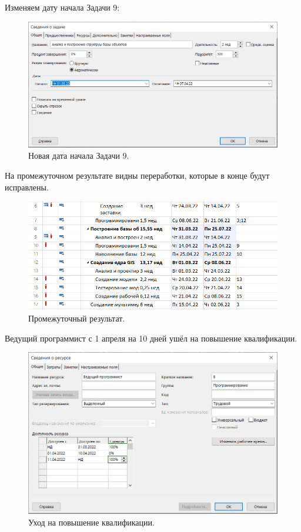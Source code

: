 \documentclass[a4paper,14pt]{extreport} %
\begin{document}
\begin{enumerate}
Изменяем дату начала Задачи 9:
\begin{figure}[H]
	\centering
	\caption{Новая дата начала Задачи 9. }
	\includegraphics[scale=0.7]{delay-task9}
\end{figure}

На промежуточном результате видны переработки, которые в конце будут исправлены.
\begin{figure}[H]
	\centering
	\caption{Промежуточный результат. }
	\includegraphics[scale=0.8]{delay-results}
\end{figure}

Ведущий программист с 1 апреля на 10 дней ушёл на повышение квалификации.
\begin{figure}[H]
	\centering
	\caption{Уход на повышение квалификации. }
	\includegraphics[scale=0.8]{powerup}
\end{figure}


\end{enumerate}
\end{document}
